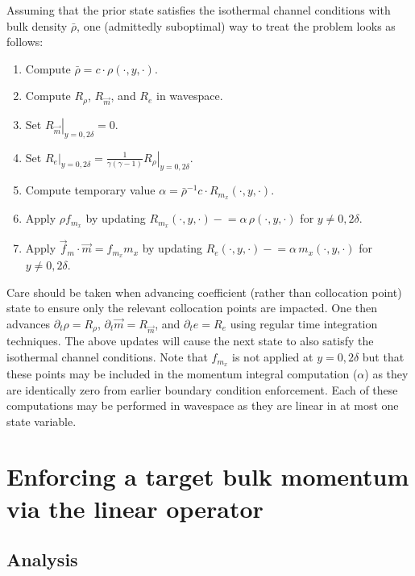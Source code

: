 \documentclass[letterpaper,11pt,nointlimits,reqno]{amsart}
\begin{document}
Assuming that the prior state satisfies the isothermal channel conditions with
bulk density $\bar{\rho}$, one (admittedly suboptimal) way to treat the
problem looks as follows:
\begin{enumerate}
  \item Compute $\bar{\rho} = c \cdot \rho\!\left(\cdot,y,\cdot\right)$.
  \item Compute $R_{\rho}$, $R_{\vec{m}}$, and $R_{e}$ in wavespace.
  \item Set $\left.R_{\vec{m}}\right|_{y=0,2\delta} = 0$.
  \item Set $\left.R_{e}\right|_{y=0,2\delta} =
        \frac{1}{\gamma\left(\gamma-1\right)}
        \left.R_{\rho}\right|_{y=0,2\delta}$.
  \item Compute temporary value $\alpha =
        \bar{\rho}^{-1} c \cdot R_{m_{x}}\!\left(\cdot,y,\cdot\right)$.
  \item Apply $\rho f_{m_x}$ by updating
        $R_{m_x}\!\left(\cdot,y,\cdot\right) -{}\!\!\!{}=
        \alpha \, \rho\!\left(\cdot,y,\cdot\right)$ for $y\neq0,2\delta$.
  \item Apply $\vec{f}_{m}\cdot\vec{m} = f_{m_x} m_x$ by updating
        $R_{e}\!\left(\cdot,y,\cdot\right) -{}\!\!\!{}=
        \alpha \, m_{x}\!\left(\cdot,y,\cdot\right)$
        for $y\neq0,2\delta$.
\end{enumerate}
Care should be taken when advancing coefficient (rather than collocation point)
state to ensure only the relevant collocation points are impacted.  One then
advances $\partial_{t}\rho = R_{\rho}$, $\partial_{t} \vec{m} = R_{\vec{m}}$,
and $\partial_{t} e = R_{e}$ using regular time integration techniques.  The
above updates will cause the next state to also satisfy the isothermal channel
conditions.  Note that $f_{m_x}$ is not applied at $y=0,2\delta$ but that these
points may be included in the momentum integral computation ($\alpha$) as they
are identically zero from earlier boundary condition enforcement.  Each of
these computations may be performed in wavespace as they are linear in at most
one state variable.


\section{Enforcing a target bulk momentum via the linear operator}

\subsection{Analysis}
\end{document}
